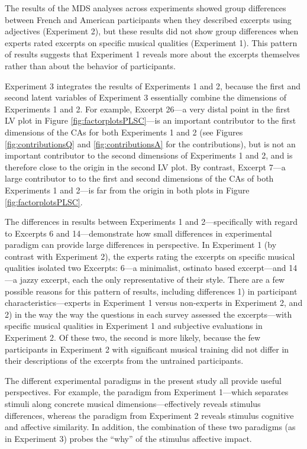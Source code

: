 \documentclass[
  english,
  man,floatsintext]{apa6}
\begin{document}
The results of the MDS analyses across experiments showed group differences between French and American participants when they described excerpts using adjectives (Experiment 2), but these results did not show group differences when experts rated excerpts on specific musical qualities (Experiment 1). This pattern of results suggests that Experiment 1 reveals more about the excerpts themselves rather than about the behavior of participants.

Experiment 3 integrates the results of Experiments 1 and 2, because the first and second latent variables of Experiment 3 essentially combine the dimensions of Experiments 1 and 2. For example, Excerpt 26---a very distal point in the first LV plot in Figure \ref{fig:factorplotsPLSC}---is an important contributor to the first dimensions of the CAs for both Experiments 1 and 2 (see Figures \ref{fig:contributionsQ} and \ref{fig:contributionsA} for the contributions), but is not an important contributor to the second dimensions of Experiments 1 and 2, and is therefore close to the origin in the second LV plot. By contrast, Excerpt 7---a large contributor to to the first and second dimensions of the CAs of both Experiments 1 and 2---is far from the origin in both plots in Figure \ref{fig:factorplotsPLSC}.

The differences in results between Experiments 1 and 2---specifically with regard to Excerpts 6 and 14---demonstrate how small differences in experimental paradigm can provide large differences in perspective. In Experiment 1 (by contrast with Experiment 2), the experts rating the excerpts on specific musical qualities isolated two Excerpts: 6---a minimalist, ostinato based excerpt---and 14---a jazzy excerpt, each the only representative of their style. There are a few possible reasons for this pattern of results, including differences 1) in participant characteristics---experts in Experiment 1 versus non-experts in Experiment 2, and 2) in the way the way the questions in each survey assessed the excerpts---with specific musical qualities in Experiment 1 and subjective evaluations in Experiment 2. Of these two, the second is more likely, because the few participants in Experiment 2 with significant musical training did not differ in their descriptions of the excerpts from the untrained participants.

The different experimental paradigms in the present study all provide useful perspectives. For example, the paradigm from Experiment 1---which separates stimuli along concrete musical dimensions---effectively reveals stimulus differences, whereas the paradigm from Experiment 2 reveals stimulus cognitive and affective similarity. In addition, the combination of these two paradigms (as in Experiment 3) probes the ``why'' of the stimulus affective impact.
\end{document}
